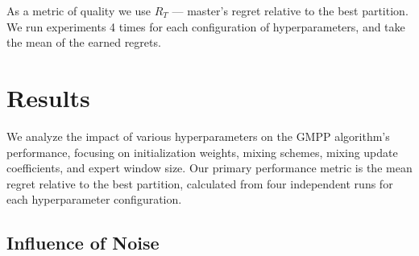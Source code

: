 \documentclass[12pt, twoside]{article}
\begin{document}
As a metric of quality we use $R_T$ --- master's regret relative to the best partition.
We run experiments 4 times for each configuration of hyperparameters, and take the mean of the earned regrets.

\newpage
\section{Results}

We analyze the impact of various hyperparameters on the GMPP algorithm's performance, focusing on initialization weights, mixing schemes, mixing update coefficients, and expert window size. Our primary performance metric is the mean regret relative to the best partition, calculated from four independent runs for each hyperparameter configuration.

\subsection{Influence of Noise}
\end{document}
